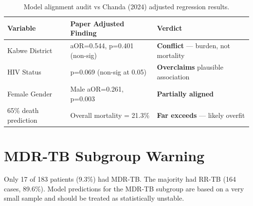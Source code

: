 \begin{table}[h!]
\centering
\begin{tabular}{p{3cm}p{5cm}p{4cm}}
\toprule
\textbf{Variable} & \textbf{Paper Adjusted Finding} & \textbf{Verdict} \\
\midrule
Kabwe District & aOR=0.544, p=0.401 (non-sig) & \textbf{Conflict} — burden, not mortality \\
HIV Status & p=0.069 (non-sig at 0.05) & \textbf{Overclaims} plausible association \\
Female Gender & Male aOR=0.261, p=0.003 & \textbf{Partially aligned} \\
65\% death prediction & Overall mortality = 21.3\% & \textbf{Far exceeds} — likely overfit \\
\bottomrule
\end{tabular}
\caption{Model alignment audit vs Chanda (2024) adjusted regression results.}
\end{table}

\section{MDR-TB Subgroup Warning}
Only 17 of 183 patients (9.3\%) had MDR-TB. The majority had RR-TB (164 cases, 89.6\%). Model predictions for the MDR-TB subgroup are based on a very small sample and should be treated as statistically unstable.

